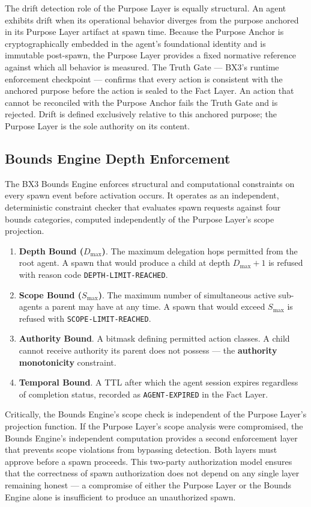 The drift detection role of the Purpose Layer is equally structural. An agent exhibits drift when its operational behavior diverges from the purpose anchored in its Purpose Layer artifact at spawn time. Because the Purpose Anchor is cryptographically embedded in the agent's foundational identity and is immutable post-spawn, the Purpose Layer provides a fixed normative reference against which all behavior is measured. The Truth Gate --- BX3's runtime enforcement checkpoint --- confirms that every action is consistent with the anchored purpose before the action is sealed to the Fact Layer. An action that cannot be reconciled with the Purpose Anchor fails the Truth Gate and is rejected. Drift is defined exclusively relative to this anchored purpose; the Purpose Layer is the sole authority on its content.

\subsection{Bounds Engine Depth Enforcement}

The BX3 Bounds Engine enforces structural and computational constraints on every spawn event before activation occurs. It operates as an independent, deterministic constraint checker that evaluates spawn requests against four bounds categories, computed independently of the Purpose Layer's scope projection.

\begin{enumerate}
  \item \textbf{Depth Bound ($D_{\max}$)}. The maximum delegation hops permitted from the root agent. A spawn that would produce a child at depth $D_{\max} + 1$ is refused with reason code \texttt{DEPTH-LIMIT-REACHED}.
  \item \textbf{Scope Bound ($S_{\max}$)}. The maximum number of simultaneous active sub-agents a parent may have at any time. A spawn that would exceed $S_{\max}$ is refused with \texttt{SCOPE-LIMIT-REACHED}.
  \item \textbf{Authority Bound}. A bitmask defining permitted action classes. A child cannot receive authority its parent does not possess --- the \textbf{authority monotonicity} constraint.
  \item \textbf{Temporal Bound}. A TTL after which the agent session expires regardless of completion status, recorded as \texttt{AGENT-EXPIRED} in the Fact Layer.
\end{enumerate}

Critically, the Bounds Engine's scope check is independent of the Purpose Layer's projection function. If the Purpose Layer's scope analysis were compromised, the Bounds Engine's independent computation provides a second enforcement layer that prevents scope violations from bypassing detection. Both layers must approve before a spawn proceeds. This two-party authorization model ensures that the correctness of spawn authorization does not depend on any single layer remaining honest --- a compromise of either the Purpose Layer or the Bounds Engine alone is insufficient to produce an unauthorized spawn.

